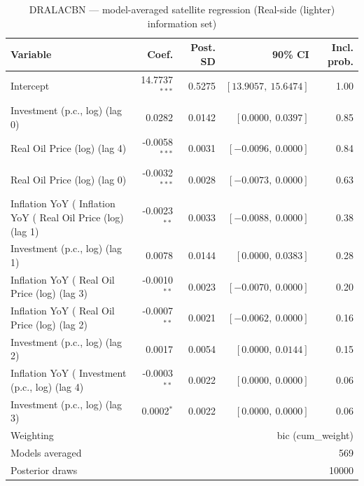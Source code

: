 \begin{table}[!htbp]
\centering
\caption{DRALACBN --- model-averaged satellite regression (Real-side (lighter) information set)}
\label{tab:dralacbn_real_side_lighter_bma_satellite}
\begin{tabular}{lrrrr}
\toprule
Variable & Coef. & Post. SD & 90\% CI & Incl. prob. \\
\midrule
Intercept & 14.7737$^{***}$ & 0.5275 & $[13.9057,\ 15.6474]$ & 1.00 \\
Investment (p.c., log) (lag 0) & 0.0282 & 0.0142 & $[0.0000,\ 0.0397]$ & 0.85 \\
Real Oil Price (log) (lag 4) & -0.0058$^{***}$ & 0.0031 & $[-0.0096,\ 0.0000]$ & 0.84 \\
Real Oil Price (log) (lag 0) & -0.0032$^{***}$ & 0.0028 & $[-0.0073,\ 0.0000]$ & 0.63 \\
Inflation YoY (%
Inflation YoY (%
Real Oil Price (log) (lag 1) & -0.0023$^{**}$ & 0.0033 & $[-0.0088,\ 0.0000]$ & 0.38 \\
Investment (p.c., log) (lag 1) & 0.0078 & 0.0144 & $[0.0000,\ 0.0383]$ & 0.28 \\
Inflation YoY (%
Real Oil Price (log) (lag 3) & -0.0010$^{**}$ & 0.0023 & $[-0.0070,\ 0.0000]$ & 0.20 \\
Inflation YoY (%
Real Oil Price (log) (lag 2) & -0.0007$^{**}$ & 0.0021 & $[-0.0062,\ 0.0000]$ & 0.16 \\
Investment (p.c., log) (lag 2) & 0.0017 & 0.0054 & $[0.0000,\ 0.0144]$ & 0.15 \\
Inflation YoY (%
Investment (p.c., log) (lag 4) & -0.0003$^{**}$ & 0.0022 & $[0.0000,\ 0.0000]$ & 0.06 \\
Investment (p.c., log) (lag 3) & 0.0002$^{*}$ & 0.0022 & $[0.0000,\ 0.0000]$ & 0.06 \\
\midrule
Weighting & \multicolumn{4}{r}{bic (cum_weight)} \\
Models averaged & \multicolumn{4}{r}{569} \\
Posterior draws & \multicolumn{4}{r}{10000} \\

\end{tabular}
\end{table}
